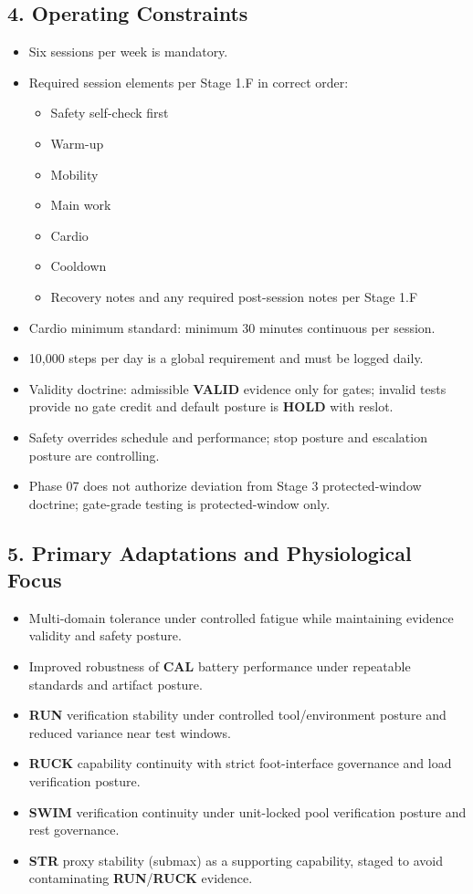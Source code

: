 \documentclass[10pt]{article}
\begin{document}
\subsection*{4. Operating Constraints}

\begin{itemize}
\item Six sessions per week is mandatory.
\item Required session elements per Stage 1.F in correct order:
  \begin{itemize}
  \item Safety self-check first
  \item Warm-up
  \item Mobility
  \item Main work
  \item Cardio
  \item Cooldown
  \item Recovery notes and any required post-session notes per Stage 1.F
  \end{itemize}
\item Cardio minimum standard: minimum 30 minutes continuous per session.
\item 10,000 steps per day is a global requirement and must be logged daily.
\item Validity doctrine: admissible \textbf{VALID} evidence only for gates; invalid tests provide no gate credit and default posture is \textbf{HOLD} with reslot.
\item Safety overrides schedule and performance; stop posture and escalation posture are controlling.
\item Phase 07 does not authorize deviation from Stage 3 protected-window doctrine; gate-grade testing is protected-window only.
\end{itemize}

\subsection*{5. Primary Adaptations and Physiological Focus}

\begin{itemize}
\item Multi-domain tolerance under controlled fatigue while maintaining evidence validity and safety posture.
\item Improved robustness of \textbf{CAL} battery performance under repeatable standards and artifact posture.
\item \textbf{RUN} verification stability under controlled tool/environment posture and reduced variance near test windows.
\item \textbf{RUCK} capability continuity with strict foot-interface governance and load verification posture.
\item \textbf{SWIM} verification continuity under unit-locked pool verification posture and rest governance.
\item \textbf{STR} proxy stability (submax) as a supporting capability, staged to avoid contaminating \textbf{RUN}/\textbf{RUCK} evidence.
\end{itemize}
\end{document}
